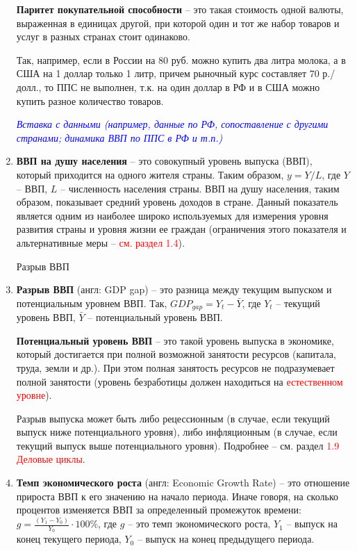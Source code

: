 \documentclass[12pt,a4paper]{article}
\begin{document}
\begin{enumerate}
\textbf{Паритет покупательной способности} – это такая стоимость одной валюты, выраженная в единицах другой, при которой один и тот же набор товаров и услуг в разных странах стоит одинаково.

Так, например, если в России на 80 руб. можно купить два литра молока, а в США на 1 доллар только 1 литр, причем рыночный курс составляет 70 р./долл., то ППС не выполнен, т.к. на один доллар в РФ и в США можно купить разное количество товаров.

\textcolor{blue}{\itshape{Вставка с данными (например, данные по РФ, сопоставление с другими странами; динамика ВВП по ППС в РФ и т.п.)}}

\item \textbf{ВВП на душу населения} – это совокупный уровень выпуска (ВВП), который приходится на одного жителя страны. Таким образом, $y=Y/L$, где $Y$ – ВВП, $L$ – численность населения страны. ВВП на душу населения, таким образом, показывает средний уровень доходов в стране. Данный показатель является одним из наиболее широко используемых для измерения уровня развития страны и уровня жизни ее граждан (ограничения этого показателя и альтернативные меры – \textcolor{red}{см. раздел 1.4}).
 
	Разрыв ВВП

\item \textbf{Разрыв ВВП} (англ: GDP gap) – это разница между текущим выпуском и потенциальным уровнем ВВП. Так, $GDP_{gap}=Y_t-\bar{Y}$, где $Y_t$ – текущий уровень ВВП,  $\bar{Y}$ – потенциальный уровень ВВП.

\textbf{Потенциальный уровень ВВП} – это такой уровень выпуска в экономике, который достигается при полной возможной занятости ресурсов (капитала, труда, земли и др.). При этом полная занятость ресурсов не подразумевает полной занятости (уровень безработицы должен находиться на \textcolor{red}{естественном уровне}).

Разрыв выпуска может быть либо рецессионным (в случае, если текущий выпуск ниже потенциального уровня), либо инфляционным (в случае, если текущий выпуск выше потенциального уровня). Подробнее – см. раздел \textcolor{red}{1.9 Деловые циклы}.

\item \textbf{Темп экономического роста} (англ: Economic Growth Rate) – это отношение прироста ВВП к его значению на начало периода. Иначе говоря, на сколько процентов изменяется ВВП за определенный промежуток времени: $g=\frac{(Y_1-Y_0)}{Y_0}\cdot100\%$, где $g$ – это темп экономического роста, $Y_1$ – выпуск на конец текущего периода, $Y_0$ – выпуск на конец предыдущего периода.


\end{enumerate}
\end{document}
